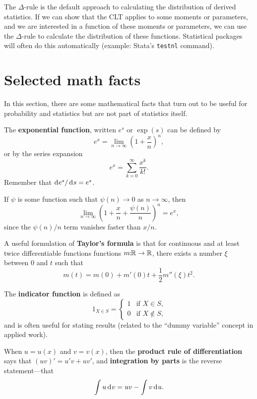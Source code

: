 \documentclass[10pt]{article}
\begin{document}
The $\Delta$-rule is the default approach to calculating the distribution of derived
statistics. If we can show that the CLT applies to some moments or parameters,
and we are interested in a function of these moments or parameters, we can use the 
$\Delta$-rule to calculate the distribution of these functions. Statistical packages
will often do this automatically (example: Stata's \texttt{testnl} command).

\section{Selected math facts}
In this section, there are some mathematical facts that turn out to be useful
for probability and statistics but are not part of statistics itself.

The \textbf{exponential function}, written $e^s$ or $\exp(s)$ can be defined by
\[ e^x = \lim_{n\rightarrow \infty} \left( 1 + \frac{x}{n} \right)^n, \]
or by the series expansion 
\[ e^x = \sum_{k=0}^\infty \frac{x^k}{k!}.\] 
Remember that $\rd e^s / \rd s =e^s$.


If $\psi$ is some function such that $\psi(n) \rightarrow 0$ as $n\rightarrow\infty$,
then \[ \lim_{n\rightarrow\infty} \left(1 + \frac{x}{n} + \frac{\psi(n)}{n}  \right)^n = e^x,\]
since the $\psi(n)/n$ term vanishes faster than $x/n$.

A useful formulation of \textbf{Taylor's formula} is that for continuous and at
least twice differentiable functions functions $m\!\!:\!\!\mathbb{R} \rightarrow \mathbb{R}$, there
exists a number $\xi$ between $0$ and $t$ such that \[ m(t) = m(0) + m'(0) t +
\frac{1}{2} m''(\xi) t^2.\]

The \textbf{indicator function} is defined as 
\[ 1_{X\in S} = \begin{cases} 1 & \text{if $X\in S$,} \\ 0 & \text{if $X\notin S$,}\end{cases}\]
and is often useful for stating results (related to the ``dummy variable'' concept in applied work).



When $u=u(x)$ and $v=v(x)$, then the \textbf{product rule of differentiation}
says that $(u v)' = u'v + u v'$,  and \textbf{integration by parts} is the reverse statement---that
\[\int u \rd v = u v - \int v \rd u. \]
\end{document}
